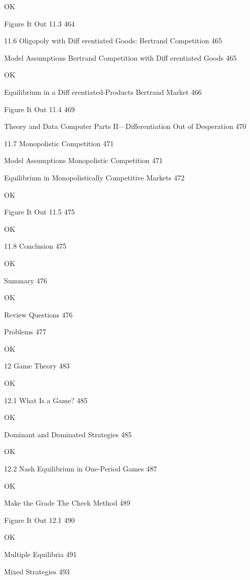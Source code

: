 OK

Figure It Out 11.3 464



11.6 Oligopoly with Diff erentiated Goods: Bertrand Competition 465



Model Assumptions Bertrand Competition with Diff erentiated Goods 465

OK

Equilibrium in a Diff erentiated-Products Bertrand Market 466



Figure It Out 11.4 469



Theory and Data Computer Parts II—Differentiation Out of Desperation 470



11.7 Monopolistic Competition 471



Model Assumptions Monopolistic Competition 471



Equilibrium in Monopolistically Competitive Markets 472

OK

Figure It Out 11.5 475

OK

11.8 Conclusion 475

OK

Summary 476

OK

Review Questions 476



Problems 477

OK

12 Game Theory 483

OK

12.1 What Is a Game? 485

OK

Dominant and Dominated Strategies 485

OK

12.2 Nash Equilibrium in One-Period Games 487

OK

Make the Grade The Check Method 489



Figure It Out 12.1 490

OK

Multiple Equilibria 491



Mixed Strategies 493



